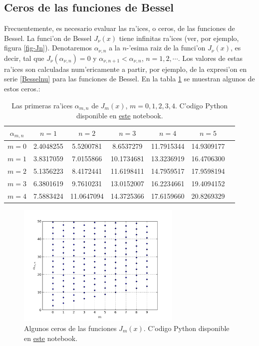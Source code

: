\subsection{Ceros de las funciones de Bessel}
Frecuentemente, es necesario evaluar las ra'ices, o ceros, de las funciones de Bessel. La funci'on de Bessel $J_\nu(x)$ tiene infinitas ra'ices (ver, por ejemplo, figura \ref{fig-Jn}). Denotaremos $\alpha_{\nu,n}$ a la $n$-'esima raiz de la funci'on $J_\nu(x)$, es decir, tal que $J_\nu(\alpha_{\nu,n})=0$ y $\alpha_{\nu,n+1}<\alpha_{\nu,n}$, $n=1,2,\cdots$. Los valores de estas ra'ices son calculadas num'ericamente a partir, por ejemplo, de la expresi'on en serie \eqref{Besselnu} para las funciones de Bessel. En la tabla \ref{tabla:alphanun} se muestran algunos de estos ceros.:
\begin{table}
\begin{center}
\begin{tabular}{ccccccc}
\hline $\alpha_{m,n}$ & $n=1$ & $n=2$ & $n=3$ & $n=4$ & $n=5$ \\ \hline 
$m=0$ & 2.4048255 &  5.5200781 &  8.6537279 & 11.7915344 & 14.9309177\\
$m=1$ & 3.8317059 &  7.0155866 & 10.1734681 & 13.3236919 & 16.4706300\\
$m=2$ & 5.1356223 &  8.4172441 & 11.6198411 & 14.7959517 & 17.9598194 \\
$m=3$ & 6.3801619 &  9.7610231 & 13.0152007 & 16.2234661 & 19.4094152 \\
$m=4$ & 7.5883424 & 11.0647094 & 14.3725366 & 17.6159660 & 20.8269329 \\
\hline 
\end{tabular} 
\caption{Las primeras ra'ices $\alpha_{m,n}$ de $J_m(x)$, $m=0,1,2,3,4$. C'odigo Python disponible en \href{https://github.com/gfrubi/FM2/blob/master/Notebooks/Bessel-Ceros.ipynb}{este} notebook.}
\label{tabla:alphanun}
\end{center}
\end{table}
\begin{figure}[H]
\centering
\includegraphics[angle=0,width=0.7\textwidth]{figs/fig-Bessel-ceros-01.pdf}
\caption{Algunos ceros de las funciones $J_m(x)$. C'odigo Python disponible en \href{https://github.com/gfrubi/FM2/blob/master/Notebooks/Bessel-Ceros.ipynb}{este} notebook.}
\label{fig-0Jn}
\end{figure}

